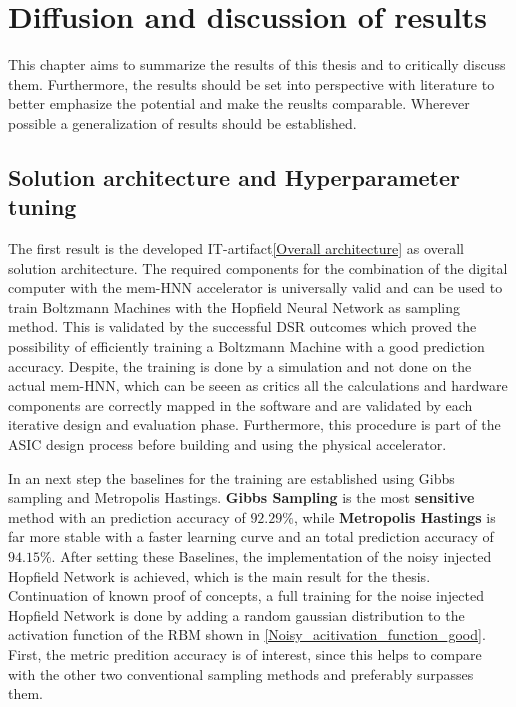\chapter{Diffusion and discussion of results}

This chapter aims to summarize the results of this thesis and to critically discuss them.
Furthermore, the results should be set into perspective with literature to better emphasize the potential
and make the reuslts comparable. 
Wherever possible a generalization of results should be established.

\section{Solution architecture and Hyperparameter tuning}

The first result is the developed \ac{IT}-artifact\ref{Overall architecture} as overall solution architecture. 
The required components for the combination of the digital computer with the \ac{mem-HNN} accelerator 
is universally valid and can be used to train Boltzmann Machines with the Hopfield Neural Network as sampling method. 
This is validated by the successful \ac{DSR} outcomes which proved the possibility of efficiently 
training a Boltzmann Machine with a good prediction accuracy.
Despite, the training is done by a simulation and not done on the actual \ac{mem-HNN}, which can be seeen as critics 
all the calculations and hardware components are correctly mapped in the software and are validated by each iterative design and evaluation phase.
Furthermore, this procedure is part of the \ac{ASIC} design process before building and using the physical accelerator.

In an next step the baselines for the training are established using Gibbs sampling and Metropolis Hastings.
\textbf{Gibbs Sampling} is the most \textbf{sensitive} method with an prediction accuracy of \(\mathbf{92.29\%}\), while
\textbf{Metropolis Hastings} is far more stable with a faster learning curve and an total prediction accuracy of \(\mathbf{94.15\%}\).
After setting these Baselines, the implementation of the noisy injected Hopfield Network is achieved, which is the main result for the thesis. 
Continuation of known proof of concepts, a full training for the noise injected Hopfield Network is done by adding a random gaussian distribution 
to the activation function of the \ac{RBM} shown in \ref{Noisy_acitivation_function_good}. 
First, the metric predition accuracy is of interest, since this helps to compare with the other two conventional sampling methods and preferably surpasses them.

